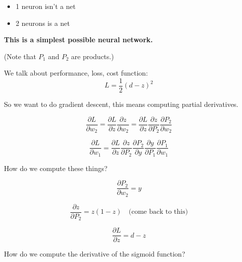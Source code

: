 
\begin{itemize}
\item 1 neuron isn't a net
\item 2 neurons is a  net
\end{itemize}

\textbf{This is a simplest possible neural network.}



(Note that $P_1$ and $P_2$ are products.)

We talk about performance, loss, cost function:
\begin{displaymath}
  L = \frac{1}{2} (d-z)^2
\end{displaymath}

So we want to do gradient descent, this means computing partial derivatives.

\begin{displaymath}
  \frac{\partial L}{\partial w_2}
  =
  \frac{\partial L}{\partial z}
  \frac{\partial z}{\partial w_2}
  =
  \frac{\partial L}{\partial z}
  \frac{\partial z}{\partial P_2}
  \frac{\partial P_2}{\partial w_2}
\end{displaymath}

\begin{displaymath}
  \frac{\partial L}{\partial w_1}
  =
  \frac{\partial L}{\partial z}
  \frac{\partial z}{\partial P_2}
  \frac{\partial P_2}{\partial y}
  \frac{\partial y}{\partial P_1}
  \frac{\partial P_1}{\partial w_1}
\end{displaymath}

How do we compute these things?

\begin{displaymath}
  \frac{\partial P_2}{\partial w_2} = y
\end{displaymath}

\begin{displaymath}
  \frac{\partial z}{\partial P_2} = z(1-z) \quad \mbox{(come back to this)}
\end{displaymath}

\begin{displaymath}
  \frac{\partial L}{\partial z} = d-z
\end{displaymath}

How do we compute the derivative of the sigmoid function?


